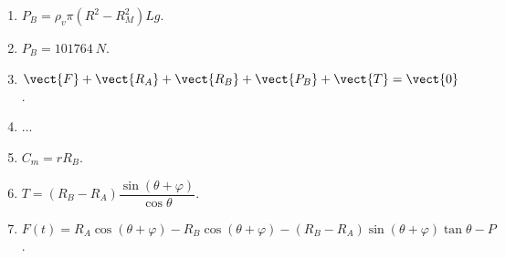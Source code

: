 \begin{enumerate}
\item $P_B = \rho_v \pi \left(R^2 - R_M^2 \right)Lg$.
\item $P_B = \SI{101764}{N}$.
\item $\vect{F}+\vect{R_A}+\vect{R_B}+\vect{P_B}+\vect{T}=\vect{0}$.
\item ...
\item $C_m = rR_B$.
\item $T =\left(R_B  -R_A\right) \dfrac{\sin \left(\theta+\varphi\right)}{\cos\theta } $.
\item $F(t)=R_A \cos \left(\theta+\varphi\right) - R_B\cos \left(\theta+\varphi\right) - \left(R_B  -R_A\right)\sin \left(\theta+\varphi\right)  \tan \theta -P$.
\end{enumerate}